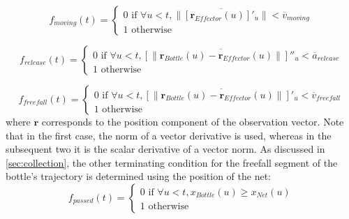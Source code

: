 \documentclass{article}
\begin{document}
\begin{equation}
    f_{moving} (t) = \begin{cases}
        0 \text{ if } \forall u < t,  \lVert \overline{\left [  \boldsymbol{r}_{Effector}(u) \right ]'_u} \rVert  < \overline{v}_{moving} \\
        1 \text{ otherwise }
    \end{cases}
\end{equation}

\begin{equation}
    f_{release} (t) = \begin{cases}
        0 \text{ if } \forall u < t, \overline{ \left [ \lVert  \boldsymbol{r}_{Bottle}(u) -  \boldsymbol{r}_{Effector}(u)  \rVert \right ] ''_u} < \overline{a}_{release} \\
        1 \text{ otherwise }
    \end{cases}
\end{equation}

\begin{equation}
    f_{freefall} (t) = \begin{cases}
        0 \text{ if } \forall u < t,  \overline{ \left [ \lVert  \boldsymbol{r}_{Bottle}(u) -  \boldsymbol{r}_{Effector}(u)  \rVert \right ] '_u} < \overline{v}_{freefall} \\
        1 \text{ otherwise }
    \end{cases}
\end{equation}
where $\boldsymbol{r}$ corresponds to the position component of the observation vector. Note that in the first case, the norm of a vector derivative is used, whereas in the subsequent two it is the scalar derivative of a vector norm. As discussed in \ref{sec:collection}, the other terminating condition for the freefall segment of the bottle's trajectory is determined using the position of the net:
\begin{equation}
    f_{passed} (t) = \begin{cases}
        0 \text{ if } \forall u < t, x_{Bottle}(u) \geq x_{Net}(u) \\
        1 \text{ otherwise }
    \end{cases}
\end{equation}
\end{document}
